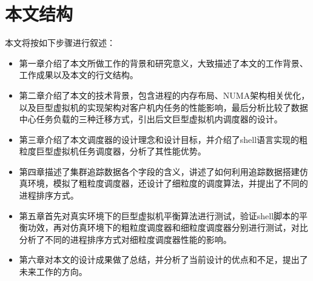 \section{本文结构}
本文将按如下步骤进行叙述：
\begin{itemize}
  \item 第一章介绍了本文所做工作的背景和研究意义，大致描述了本文的工作背景、工作成果以及本文的行文结构。
  \item 第二章介绍了本文的技术背景，包含进程的内存布局、NUMA架构相关优化，以及巨型虚拟机的实现架构对客户机内任务的性能影响，最后分析比较了数据中心任务负载的三种迁移方式，引出后文巨型虚拟机内调度器的设计。
  \item 第三章介绍了本文调度器的设计理念和设计目标，并介绍了shell语言实现的粗粒度巨型虚拟机任务调度器，分析了其性能优势。
  \item 第四章描述了集群追踪数据各个字段的含义，讲述了如何利用追踪数据搭建仿真环境，模拟了粗粒度调度器，还设计了细粒度的调度算法，并提出了不同的进程排序方式。
  \item 第五章首先对真实环境下的巨型虚拟机平衡算法进行测试，验证shell脚本的平衡功效，再对仿真环境下的粗粒度调度器和细粒度调度器分别进行测试，对比分析了不同的进程排序方式对细粒度调度器性能的影响。
  \item 第六章对本文的设计成果做了总结，并分析了当前设计的优点和不足，提出了未来工作的方向。
\end{itemize}
